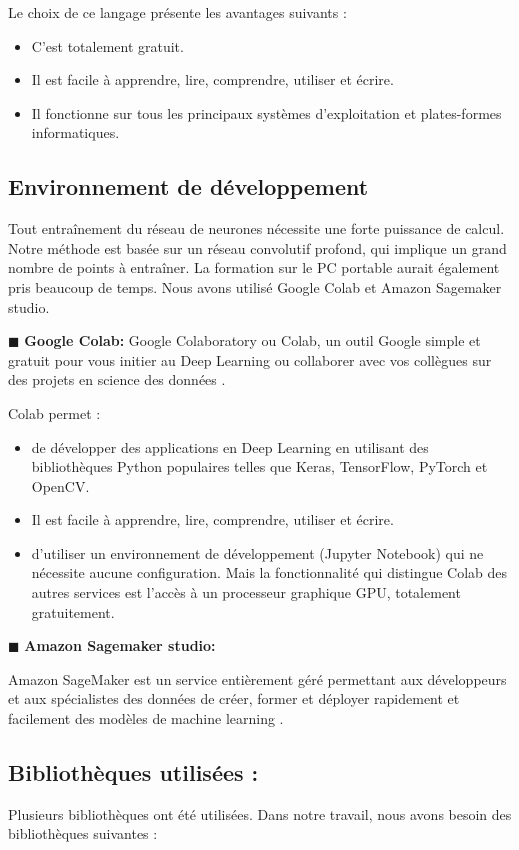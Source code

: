 Le choix de ce langage présente les avantages suivants :
\begin{itemize}
\item C'est totalement gratuit.
\item  Il est facile à apprendre, lire, comprendre, utiliser et écrire.
\item Il fonctionne sur tous les principaux systèmes d'exploitation et plates-formes informatiques.
\end{itemize}


\subsection{Environnement de développement}
Tout entraînement du réseau de neurones nécessite une forte puissance de calcul. Notre méthode est
basée sur un réseau convolutif profond, qui implique un grand nombre de points à entraîner.
La formation sur le PC portable aurait également pris beaucoup de temps. Nous avons utilisé Google Colab et Amazon Sagemaker studio.\newline

$\blacksquare$ \textbf{ Google Colab:}
Google Colaboratory ou Colab, un outil Google simple et gratuit pour vous initier au Deep Learning ou collaborer avec vos collègues sur des projets en science des données \cite{gcolab}. 
  
Colab permet :
\begin{itemize}
\item de développer des applications en Deep Learning en utilisant des bibliothèques Python populaires telles que Keras, TensorFlow, PyTorch et OpenCV.
\item  Il est facile à apprendre, lire, comprendre, utiliser et écrire.
\item d’utiliser un environnement de développement (Jupyter Notebook) qui ne nécessite aucune configuration.
Mais la fonctionnalité qui distingue Colab des autres services est l’accès à un processeur graphique GPU, totalement gratuitement.
\end{itemize}

$\blacksquare$ \textbf{ Amazon Sagemaker studio:}

Amazon SageMaker est un service entièrement géré permettant aux développeurs et aux spécialistes des données de créer, former et déployer rapidement et facilement des modèles de machine learning \cite{amazonsm}.

\subsection{Bibliothèques utilisées :}
Plusieurs bibliothèques ont été utilisées. Dans notre travail, nous avons besoin des bibliothèques suivantes :

